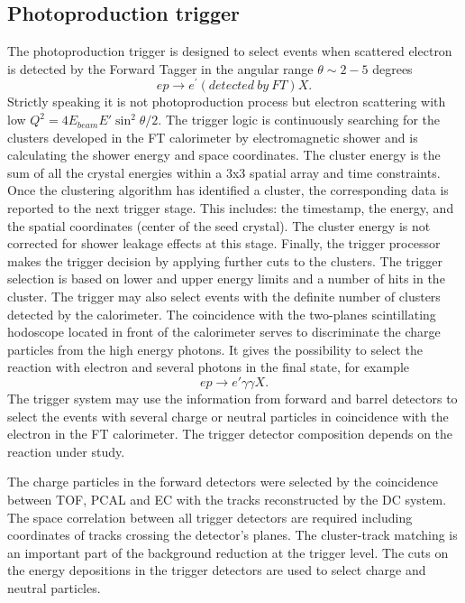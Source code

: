 \subsection{Photoproduction trigger}
The photoproduction trigger is designed to select  events when scattered electron is detected by the Forward Tagger in the angular range $\theta\sim2-5$ degrees
$$
e p  \rightarrow e^\prime(detected\ by\ FT) X.
$$
\noindent
Strictly speaking it is not photoproduction process but electron scattering with  low $Q^2=4E_{beam}E'\sin^2\theta/2$.
The trigger logic is continuously searching for the clusters developed in the FT calorimeter by electromagnetic shower and is calculating the shower energy and space coordinates. 
The cluster energy is the sum of all the
crystal energies within a 3x3 spatial array and time constraints. Once
the clustering algorithm  has identified a cluster, the
corresponding data is reported to the next trigger stage. This
includes: the timestamp, the energy, and the spatial coordinates (center
of the seed crystal). The cluster energy is not corrected for shower
leakage effects at this stage. Finally, the trigger processor makes the
trigger decision by applying further cuts to the clusters. The trigger  selection is based on lower and upper energy limits and a number of hits in the cluster. The trigger may also select events with the definite number of clusters detected by the calorimeter. 
The coincidence with the two-planes  scintillating hodoscope   located in front of the calorimeter serves to discriminate the charge particles from the high energy photons. 
It gives the possibility to select the reaction with electron and several photons in the final state, for example
$$
ep\to e'\gamma\gamma X.
$$
\noindent
The trigger system may use the  information from forward and barrel detectors to select the events with several charge or neutral particles in coincidence with the electron in the FT calorimeter. The trigger detector composition depends on the reaction under study. 

The charge particles in the forward detectors  were selected by the coincidence between TOF, PCAL and EC with the tracks reconstructed by the DC system. The space correlation between all trigger detectors are required including coordinates 
 of tracks crossing the detector's planes. The cluster-track matching is an important part of the background reduction at the trigger level. The cuts on the energy depositions in the trigger detectors are used to select charge and neutral particles. 
 
